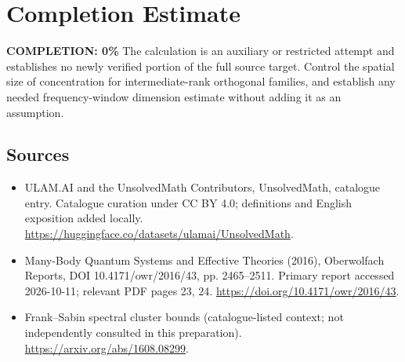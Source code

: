 \documentclass[11pt]{article}
\begin{document}
\section{Completion Estimate}
\noindent\textbf{COMPLETION: 0\%}
The calculation is an auxiliary or restricted attempt and establishes no newly verified portion of the full source target. Control the spatial size of concentration for intermediate-rank orthogonal families, and establish any needed frequency-window dimension estimate without adding it as an assumption.

\subsection{Sources}
\begin{itemize}
\item[\hypertarget{source:statement:1}{S1}] ULAM.AI and the UnsolvedMath Contributors, UnsolvedMath, catalogue entry. Catalogue curation under CC BY 4.0; definitions and English exposition added locally.
\url{https://huggingface.co/datasets/ulamai/UnsolvedMath}.
\item[\hypertarget{source:statement:2}{S2}] Many-Body Quantum Systems and Effective Theories (2016), Oberwolfach Reports, DOI 10.4171/owr/2016/43, pp. 2465--2511. Primary report accessed 2026-10-11; relevant PDF pages 23, 24.
\url{https://doi.org/10.4171/owr/2016/43}.
\item[\hypertarget{source:statement:3}{S3}] Frank--Sabin spectral cluster bounds (catalogue-listed context; not independently consulted in this preparation).
\url{https://arxiv.org/abs/1608.08299}.
\end{itemize}
\label{end:statement}
\end{document}
